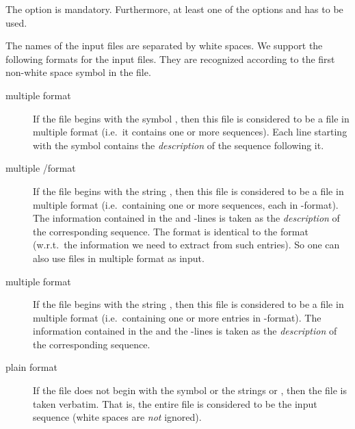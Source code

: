 \documentclass[11pt,a4paper,titlepage]{article}
\begin{document}
The option  is mandatory. Furthermore, at least one of the options  and  has to be used.

The names of the input files are separated by white spaces. 
We support the following formats for the input files.
They are recognized according to the first non-white space symbol in
the file.
\begin{description}
\item[multiple \Fasta format]
If the file begins with the symbol \Fastastart,
then this file is considered to be a file in multiple \Fasta format
(i.e.\ it contains one or more sequences).
Each line starting with the symbol \Fastastart contains the
\emph{description} of the sequence following it.

\item[multiple \EMBL/\SWISSPROT format] 
If the file begins with the string , 
then this file is considered to be a file in multiple \EMBL format
(i.e.\ containing one or more sequences, each in \EMBL-format).
The information contained in
the  and -lines is taken as the
\emph{description} of the
corresponding sequence. The \EMBL format is identical
to the \SWISSPROT format (w.r.t.\ the information we need to extract
from such entries). So one can also use files in multiple
\SWISSPROT format as input.

\item[multiple \GENBANK format]

If the file begins with the string ,
then this
file is considered to be a file in multiple \GENBANK format (i.e.\ containing
one or more entries in \GENBANK-format).
The information contained in the  and the
-lines is taken as the
\emph{description} of the corresponding sequence.

\item[plain format]
If the file does not begin with the symbol
\Fastastart or the strings  or
, then the file is taken verbatim. That is, the
entire file is considered to be the input sequence (white spaces are
\emph{not} ignored).
\end{description}
\end{document}

